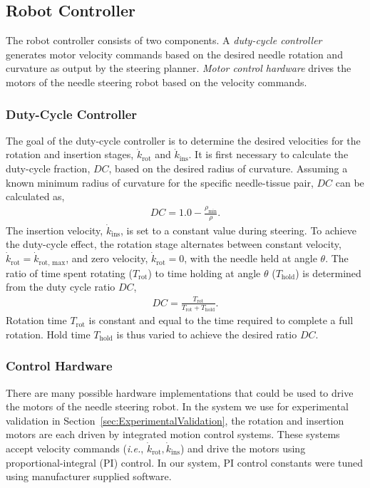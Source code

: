 \subsection{Robot Controller} 
The robot controller consists of two components. A \emph{duty-cycle controller} generates motor velocity commands based on the desired needle rotation and curvature as output by the steering planner. \emph{Motor control hardware} drives the motors of the needle steering robot based on the velocity commands.

\subsubsection{Duty-Cycle Controller}
The goal of the duty-cycle controller is to determine the desired velocities for the rotation and insertion stages, $\dot{k}_\text{rot}$ and $\dot{k}_\text{ins}$. It is first necessary to calculate the duty-cycle fraction, $DC$, based on the desired radius of curvature. Assuming a known minimum radius of curvature for the specific needle-tissue pair, $DC$ can be calculated as,
\begin{align}
DC = 1.0 - \frac{\rho_\text{min}}{\rho}. 
\label{eq:DC}
\end{align}
The insertion velocity, $\dot{k}_\text{ins}$, is set to a constant value during steering.  To achieve the duty-cycle effect, the rotation stage alternates between constant velocity, $\dot{k}_\text{rot} = \dot{k}_\text{rot, max}$, and zero velocity, $\dot{k}_\text{rot} = 0$, with the needle held at angle $\theta$. The ratio of time spent rotating ($T_\text{rot}$) to time holding at angle $\theta$ ($T_\text{hold}$) is determined from the duty cycle ratio $DC$,
\begin{align}
DC =\frac{T_\text{rot}}{T_\text{rot}+T_\text{hold}}.
\end{align}
Rotation time $T_\text{rot}$ is constant and equal to the time required to complete a full rotation. Hold time $T_\text{hold}$ is thus varied to achieve the desired ratio $DC$.

\subsubsection{Control Hardware}
There are many possible hardware implementations that could be used to drive the motors of the needle steering robot. In the system we use for experimental validation in Section~\ref{sec:ExperimentalValidation}, the rotation and insertion motors are each driven by integrated motion control systems. These systems accept velocity commands (\textit{i.e.}, $\dot{k}_\text{rot}, \dot{k}_\text{ins}$) and drive the motors using proportional-integral (PI) control. In our system, PI control constants were tuned using manufacturer supplied software.

